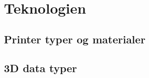 \section{Teknologien} %



\subsection{Printer typer og materialer} %
\label{sub:materialer}



\subsection{3D data typer}












